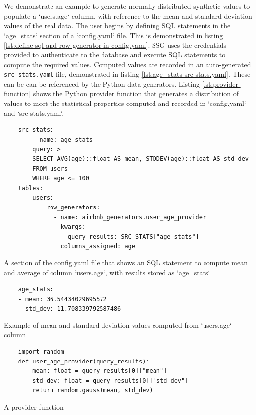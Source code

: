 \documentclass[11pt]{article}
\begin{document}
We demonstrate an example to generate normally distributed synthetic values to populate a `users.age` column, with reference to the mean and standard deviation values of the real data. The user begins by defining SQL statements in the `age\_stats` section of a `config.yaml` file. This is demonstrated in listing \ref{lst:define sql and row generator in config.yaml}. SSG uses the credentials provided to authenticate to the database and execute SQL statements to compute the required values. Computed values are recorded in an auto-generated \texttt{src-stats.yaml} file, demonstrated in listing \ref{lst:age_stats src-stats.yaml}. These can be can be referenced by the Python data generators. Listing \ref{lst:provider-function} shows the Python provider function that generates a distribution of values to meet the statistical properties computed and recorded in `config.yaml` and `src-stats.yaml`.

\begin{listing}[H]
\begin{verbatim}
    src-stats:
        - name: age_stats
        query: >
        SELECT AVG(age)::float AS mean, STDDEV(age)::float AS std_dev
        FROM users
        WHERE age <= 100
    tables:
        users:
            row_generators:
              - name: airbnb_generators.user_age_provider
                kwargs:
                  query_results: SRC_STATS["age_stats"]
                columns_assigned: age
\end{verbatim}
\caption{A section of the config.yaml file that shows an SQL statement to compute mean and average of column `users.age`, with results stored as `age_stats` }
\label{lst:define sql and row generator in config.yaml}
\end{listing}

\begin{listing}[H]
\begin{verbatim}
    age_stats:
    - mean: 36.54434029695572
      std_dev: 11.708339792587486
\end{verbatim}
\caption{Example of mean and standard deviation values computed from `users.age` column}
\label{lst:age_stats src-stats.yaml}
\end{listing}

\begin{listing}[H]
\begin{verbatim}
    import random
    def user_age_provider(query_results):
        mean: float = query_results[0]["mean"]
        std_dev: float = query_results[0]["std_dev"]
        return random.gauss(mean, std_dev)
\end{verbatim} 
\caption{A provider function }
\label{lst:provider-function}
\end{listing}
\end{document}
